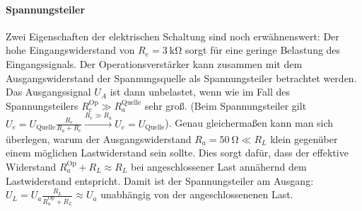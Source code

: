 \paragraph{Spannungsteiler}
Zwei Eigenschaften der elektrischen Schaltung sind noch erwähnenswert: Der hohe Eingangswiderstand von \(R_e=\qty{3}{\kilo\ohm}\) sorgt für eine geringe Belastung des Eingangssignals. Der Operationsverstärker kann zusammen mit dem Ausgangswiderstand der Spannungsquelle als Spannungsteiler betrachtet werden. Das Ausgangssignal \(U_A\) ist dann unbelastet, wenn wie im Fall des Spannungsteilers \(R^\text{Op}_e\gg R_a^\text{Quelle}\) sehr groß. (Beim Spannungsteiler gilt \(U_e=U_\text{Quelle}\frac{R_e}{R_a+R_e}\xrightarrow{R_e\gg R_a}U_e=U_\text{Quelle}\)).
Genau gleichermaßen kann man sich überlegen, warum der Ausgangswiderstand \(R_a=\qty{50}{\ohm}\ll R_L\)\autocite{Skript_2.2} klein gegenüber einem möglichen Lastwiderstand sein sollte. Dies sorgt dafür, dass der effektive Widerstand \(R^\text{Op}_a+R_L\approx R_L\) bei angeschlossener Last annähernd dem Lastwiderstand entspricht. Damit ist der Spannungsteiler am Ausgang: \(U_L=U_a\frac{R_L}{R^\text{Op}_a+R_L}\approx U_a\) unabhängig von der angeschlossenenen Last. 

